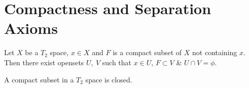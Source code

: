 



\section{Compactness and Separation Axioms}
\begin{proposition}
	Let $X$ be a $T_2$ space, $x \in X$ and $F$ is a compact subset of $X$ not containing $x$. Then there exist opensets $U,\ V$ such that $x \in U$, $F \subset V$ \& $U \cap V = \phi$.
\end{proposition}

\begin{corollary}
	A compact subset in a $T_2$ space is closed.
\end{corollary}

